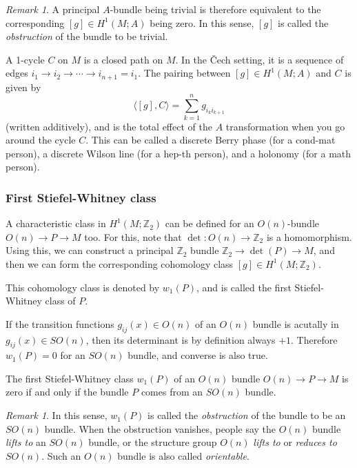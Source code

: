 \documentclass[12pt]{article}
\numberwithin{equation}{section}
\numberwithin{figure}{section}
\theoremstyle{remark}
\newtheorem{remark}[definition]{Remark}
\def\bZ{\mathbb{Z}}
\begin{document}
\begin{remark}
A principal $A$-bundle being trivial is therefore equivalent to the corresponding $[g]\in H^1(M;A)$ being zero.
In this sense, $[g]$ is called the \emph{obstruction} of the bundle to be trivial.
\end{remark}

A 1-cycle $C$ on $M$ is a closed path on $M$.
In the \v Cech setting, it is a sequence of edges
$i_1 \to i_2 \to \cdots \to i_{n+1}=i_1$.
The pairing between $[g]\in H^1(M;A)$ and $C$ is given by \begin{equation}
  \langle [g],C\rangle = \sum_{k=1}^{n} g_{i_k i_{k+1}}
\end{equation} (written additively),
and is the total effect of the $A$ transformation when you go around the cycle $C$.
This can be called a discrete Berry phase (for a cond-mat person),
a discrete Wilson line (for a hep-th person),
and a holonomy (for a math person).

\subsubsection{First Stiefel-Whitney class}


A characteristic class in $H^1(M;\bZ_2)$ can be defined for an $O(n)$-bundle
$O(n)\to P\to M$  too.
For this, note that $\det: O(n)\to \bZ_2$ is a homomorphism.
Using this, we can construct a principal $\bZ_2$ bundle  $\bZ_2\to \det(P)\to M$,
and then we can form the corresponding cohomology class $[g]\in H^1(M;\bZ_2)$.
\begin{definition}
  This cohomology class is denoted by $w_1(P)$, and is called the first Stiefel-Whitney class of $P$.
\end{definition}

If the transition functions $g_{ij}(x)\in O(n)$ of an $O(n)$ bundle 
is acutally in $g_{ij}(x)\in SO(n)$, then its determinant is by definition always $+1$.
Therefore $w_1(P)=0$ for an $SO(n)$ bundle,
and converse is also true.

\begin{proposition}
  The first Stiefel-Whitney class $w_1(P)$ of an $O(n)$ bundle $O(n)\to P\to M$ is zero if and only if the bundle $P$ comes from an $SO(n)$ bundle.
\end{proposition}

\begin{remark}
In this sense, $w_1(P)$ is called the \emph{obstruction} of the bundle to be an $SO(n)$ bundle.
When the obstruction vanishes, people say the $O(n)$ bundle \emph{lifts to} an $SO(n)$ bundle,
or the structure group $O(n)$ \emph{lifts to} or \emph{reduces to} $SO(n)$.
Such an $O(n)$ bundle is also called \emph{orientable}.
\end{remark}
\end{document}
